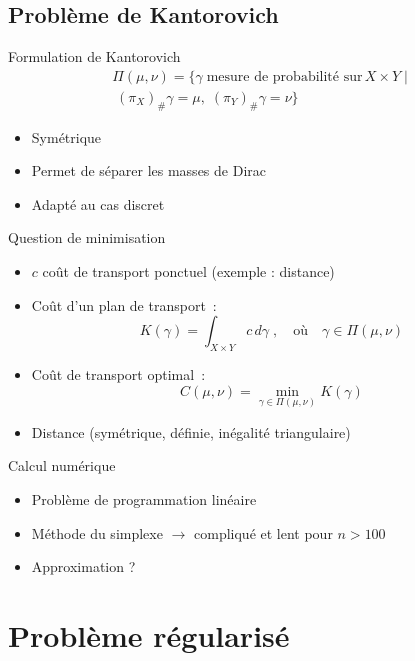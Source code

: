 \documentclass{beamer}
\begin{document}
\subsection{Problème de Kantorovich}

\begin{frame}{Formulation de Kantorovich}
\[
\begin{split}
\Pi(\mu,\nu) = \{\gamma\;\text{mesure de probabilité sur}\,X\times Y\;| \\
\;(\pi_X)_\# \gamma = \mu,\; (\pi_Y)_\# \gamma = \nu\}
\end{split}
\]
	\begin{itemize}
	\item Symétrique
	\item Permet de séparer les masses de Dirac
	\item Adapté au cas discret
	\end{itemize}
\end{frame}

\begin{frame}{Question de minimisation}
\begin{itemize}
\item $c$ coût de transport ponctuel (exemple : distance)
\item Coût d'un plan de transport~:
\[
K(\gamma) = \int_{X\times Y} c\,d\gamma \; ,\quad \text{où} \quad \gamma \in \Pi(\mu,\nu)
\]
\pause
\item Coût de transport optimal~:
\[C(\mu,\nu) = \min_{\gamma \in \Pi(\mu,\nu)} K(\gamma) \]
\pause
\item Distance (symétrique, définie, inégalité triangulaire)
\end{itemize}
\end{frame}

\begin{frame}{Calcul numérique}
\begin{itemize}
	\item Problème de programmation linéaire
	\item Méthode du simplexe $\rightarrow$ compliqué et lent pour $n>100$
	\item Approximation ?
\end{itemize}
\end{frame}



\section{Problème régularisé}
\end{document}
